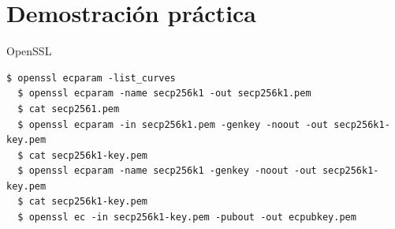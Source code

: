 \documentclass[12pt]{beamer}
\begin{document}
\section{Demostración práctica}\label{demo}
\normalsize
\begin{frame}[fragile]{OpenSSL}
\begin{Verbatim}[breaklines=true]
  $ openssl ecparam -list_curves
  $ openssl ecparam -name secp256k1 -out secp256k1.pem
  $ cat secp2561.pem
  $ openssl ecparam -in secp256k1.pem -genkey -noout -out secp256k1-key.pem
  $ cat secp256k1-key.pem 
  $ openssl ecparam -name secp256k1 -genkey -noout -out secp256k1-key.pem
  $ cat secp256k1-key.pem
  $ openssl ec -in secp256k1-key.pem -pubout -out ecpubkey.pem
\end{Verbatim}

\end{frame}
\end{document}
